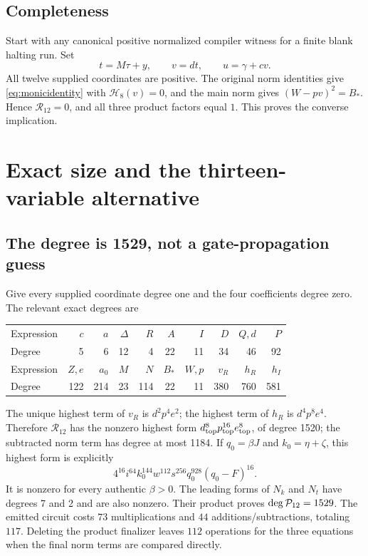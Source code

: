 \documentclass[11pt,letterpaper]{article}
\theoremstyle{remark}\newtheorem{remark}[theorem]{Remark}
\begin{document}
\subsection{Completeness}
Start with any canonical positive normalized compiler witness for a finite
blank halting run. Set
\[
 t=M\tau+y,\qquad v=dt,\qquad u=\gamma+cv.
\]
All twelve supplied coordinates are positive. The original norm identities
give \eqref{eq:monicidentity} with $\mathcal H_8(v)=0$, and the main norm
gives $(W-pv)^2=B_*$. Hence $\mathcal R_{12}=0$, and all three product
factors equal $1$. This proves the converse implication.

\section{Exact size and the thirteen-variable alternative}\label{sec:degree}

\subsection{The degree is 1529, not a gate-propagation guess}
Give every supplied coordinate degree one and the four coefficients degree
zero. The relevant exact degrees are
\begin{center}\small
\begin{tabular}{lrrrrrrrrr}\toprule
Expression &$c$&$a$&$\Delta$&$R$&$A$&$I$&$D$&$Q,d$&$P$\\
Degree&5&6&12&4&22&11&34&46&92\\\midrule
Expression &$Z,e$&$a_0$&$M$&$N$&$B_*$&$W,p$&$v_R$&$h_R$&$h_I$\\
Degree&122&214&23&114&22&11&380&760&581\\\bottomrule
\end{tabular}
\end{center}
The unique highest term of $v_R$ is $d^2p^4e^2$; the highest term of $h_R$
is $d^4p^8e^4$. Therefore $\mathcal R_{12}$ has the nonzero highest form
$d_{\rm top}^8p_{\rm top}^{16}e_{\rm top}^8$, of degree 1520; the subtracted
norm term has degree at most 1184. If $q_0=\beta J$ and $k_0=\eta+\zeta$,
this highest form is explicitly
\[
 4^{16} i^{64}k_0^{144}w^{112}s^{256}q_0^{928}(q_0-F)^{16}.
\]
It is nonzero for every authentic $\beta>0$. The leading forms of $N_k$ and
$N_t$ have degrees 7 and 2 and are also nonzero. Their product proves
$\deg\mathcal P_{12}=1529$. The emitted circuit costs $73$ multiplications and
$44$ additions/subtractions, totaling $117$. Deleting the product finalizer
leaves $112$ operations for the three equations when the final norm terms
are compared directly.
\end{document}
